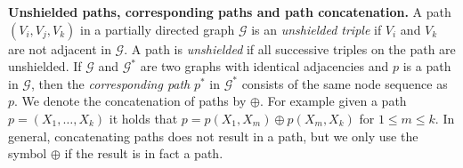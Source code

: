 \documentclass[11pt,a4paper]{article}
\theoremstyle{definition}
\theoremstyle{remark}
\newcommand{\pstar}[1][p]{{#1}^{*}}
\newcommand{\g}[1][G]{\mathcal{#1}}
\newcommand{\vsp}{\vspace{.2cm}}
\begin{document}



\vsp

\noindent{}\textbf{Unshielded paths, corresponding paths and path concatenation.} A path \linebreak $(V_{i},V_{j},V_{k})$ in a partially directed graph $\g$ is an \emph{unshielded triple} if $ V_{i} $ and $ V_{k}$ are not adjacent in $\g$. A path is \textit{unshielded} if all successive triples on the path are unshielded. 
If $\g$ and $\g^*$ are two graphs with identical adjacencies and $p$ is a path in $\g$, then the \textit{corresponding path} $\pstar$ in $\g^*$ consists of the same node sequence as $p$.  We denote the concatenation of paths by $\oplus$. For example given a path $p=(X_1, \dots, X_k)$ it holds that $p = p(X_1,X_{m}) \oplus p(X_{m},X_{k})$ for $1 \le m \le k$. In general, concatenating paths does not result in a path, but we only use the symbol $\oplus$ if the result is in fact a path. 
\end{document}
